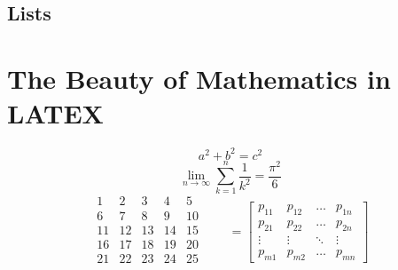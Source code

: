 \documentclass[a4paper, 12pt]{article}
\begin{document}
\subsection{Lists}
\newpage
\section{The Beauty of Mathematics in LATEX}
\begin{equation}
a^2+b^2=c^2
\end{equation}
\begin{equation}
\lim_{n \to \infty}
\sum_{k=1}^n \frac{1}{k^2}
=\frac{\pi^2}{6}
\end{equation}
\begin{equation}
\begin{matrix}
1 & 2 & 3 & 4 & 5 \\
6 & 7 & 8 & 9 & 10 \\
11 & 12 & 13 & 14 & 15\\
16 & 17 & 18 & 19 & 20\\ 
21 & 22 & 23 & 24 & 25 \\
\end{matrix} \qquad =
\begin{bmatrix}
p_{11} & p_{12} & \ldots
& p_{1n} \\
p_{21} & p_{22} & \ldots
& p_{2n} \\
\vdots & \vdots & \ddots
& \vdots \\
p_{m1} & p_{m2} & \ldots
& p_{mn}
\end{bmatrix}
\end{equation}
\end{document}
